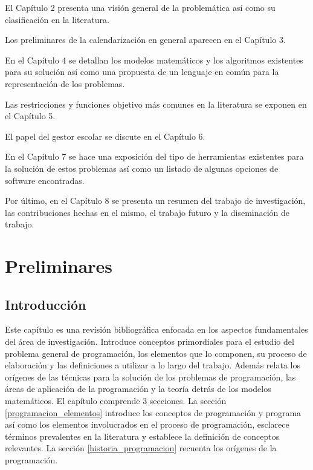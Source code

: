 \documentclass[spanish,draft,12pt,headsepline,footsepline,paper=letter]{scrreprt}
\begin{document}
El Capítulo 2 presenta una visión general de la problemática así como su clasificación en la literatura.

Los preliminares de la calendarización en general aparecen en el Capítulo 3.

En el Capítulo 4 se detallan los modelos matemáticos y los algoritmos existentes para su solución así como una propuesta de un lenguaje en común para la representación de los problemas.

Las restricciones y funciones objetivo más comunes en la literatura se exponen en el Capítulo 5.

El papel del gestor escolar se discute en el Capítulo 6.

En el Capítulo 7 se hace una exposición del tipo de herramientas existentes para la solución de estos problemas así como un listado de algunas opciones de software encontradas.

Por último, en el Capítulo 8 se presenta un resumen del trabajo de investigación, las contribuciones hechas en el mismo, el trabajo futuro y la diseminación de trabajo.

\chapter{Preliminares}
\label{preliminares}

\section{Introducción}
\label{introduccion_preliminares}

Este capítulo es una revisión bibliográfica enfocada en los aspectos fundamentales del área de investigación.
Introduce conceptos primordiales para el estudio del problema general de programación, los elementos que lo componen, su proceso de elaboración y las definiciones a utilizar a lo largo del trabajo. Además relata los orígenes de las técnicas para la solución de los problemas de programación, las áreas de aplicación de la programación y la teoría detrás de los modelos matemáticos.
El capítulo comprende 3 secciones. La sección \ref{programacion_elementos} introduce los conceptos de programación y programa así como los elementos involucrados en el proceso de programación, esclarece términos prevalentes en la literatura y establece la definición de conceptos relevantes. La sección \ref{historia_programacion} recuenta los orígenes de la programación.
\end{document}
